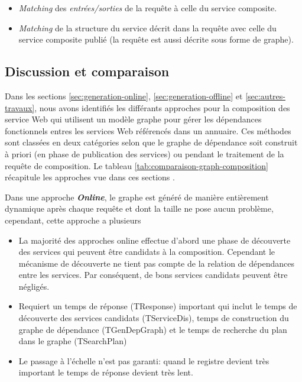  \SpecialItem
  \begin{itemize}
  \item \textit{Matching} des \textit{entrées/sorties} de la requête à
    celle du service composite.

  \item \textit{Matching} de la structure du service décrit dans la
    requête avec celle du service composite publié (la requête est
    aussi décrite sous forme de graphe).
  \end{itemize}
  \enddescription

  \subsection{Discussion et comparaison}
  \label{sec:discussion-comparaison}
  Dans les sections \ref{sec:generation-online},
  \ref{sec:generation-offline} et \ref{sec:autres-travaux}, nous avons
  identifiés les différants approches pour la composition des service
  Web qui utilisent un modèle graphe pour gérer les dépendances
  fonctionnels entres les services Web référencés dans un
  annuaire. Ces méthodes sont classées en deux catégories selon que le
  graphe de dépendance soit construit à priori (en phase de
  publication des services) ou pendant le traitement de la requête de
  composition. Le tableau \ref{tab:comparaison-graph-composition}
  récapitule les approches vue dans ces sections . \bigskip

  Dans une approche \textbf{\textit{Online}}, le graphe est généré de
  manière entièrement dynamique après chaque requête et dont la taille
  ne pose aucun problème, cependant, cette approche a
  plusieurs

  \SpecialItem
  \begin{itemize}
    \item  La majorité des approches online effectue d'abord une phase de
    découverte des services qui peuvent être candidats à la
    composition. Cependant le mécanisme de découverte ne tient pas
    compte de la relation de dépendances entre les services. Par
    conséquent, de bons services candidats peuvent être négligés.

  \item Requiert un temps de réponse (TResponse) important qui inclut
    le temps de découverte des services candidats (TServiceDis), temps
    de construction du graphe de dépendance (TGenDepGraph) et le temps
    de recherche du plan dans le graphe (TSearchPlan)

  \item Le passage à l'échelle n'est pas garanti: quand le registre
    devient très important le temps de réponse devient très
    lent.\bigskip

  \end{itemize}
  \enddescription

